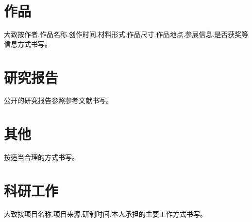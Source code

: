 \section*{作品}

大致按作者.作品名称.创作时间.材料形式.作品尺寸.作品地点.参展信息.是否获奖等信息方式书写。

\section*{研究报告}

公开的研究报告参照参考文献书写。

\section*{其他}

按适当合理的方式书写。

\section*{科研工作}

大致按项目名称.项目来源.研制时间.本人承担的主要工作方式书写。
